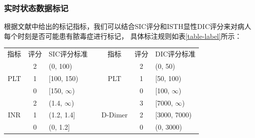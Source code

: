 \documentclass[12pt, a4paper, oneside]{ctexart}
\numberwithin{equation}{section}  %
\begin{document}
\subsubsection{实时状态数据标记}
根据文献\cite{bib-determine-dic}中给出的标记指标，我们可以结合SIC评分和ISTH显性DIC评分来对病人每个时刻是否可能患有脓毒症进行标记，
具体标注规则如表\ref{table-label}所示：
\renewcommand\arraystretch{1.2} %
\begin{table}[H] %
    \centering %
\begin{tabular}{ccllccl}
\cline{1-3} \cline{5-7}
\multicolumn{1}{|c|}{指标}                   & \multicolumn{1}{c|}{评分} & \multicolumn{1}{c|}{SIC评分标准}      & \multicolumn{1}{c|}{} & \multicolumn{1}{c|}{指标}                       & \multicolumn{1}{c|}{评分} & \multicolumn{1}{c|}{DIC评分标准}        \\ \cline{1-3} \cline{5-7} 
\multicolumn{1}{|c|}{\multirow{3}{*}{PLT}} & \multicolumn{1}{c|}{2}  & \multicolumn{1}{l|}{(0, 100)}     & \multicolumn{1}{l|}{} & \multicolumn{1}{c|}{\multirow{3}{*}{PLT}}     & \multicolumn{1}{c|}{2}  & \multicolumn{1}{l|}{(0, 50)}        \\ \cline{2-3} \cline{6-7} 
\multicolumn{1}{|c|}{}                     & \multicolumn{1}{c|}{1}  & \multicolumn{1}{l|}{{[}100, 150)} & \multicolumn{1}{l|}{} & \multicolumn{1}{c|}{}                         & \multicolumn{1}{c|}{1}  & \multicolumn{1}{l|}{{[}50, 100)}    \\ \cline{2-3} \cline{6-7} 
\multicolumn{1}{|c|}{}                     & \multicolumn{1}{c|}{0}  & \multicolumn{1}{l|}{{[}150, $\infty$)}   & \multicolumn{1}{l|}{} & \multicolumn{1}{c|}{}                         & \multicolumn{1}{c|}{0}  & \multicolumn{1}{l|}{{[}100, $\infty$)}     \\ \cline{1-3} \cline{5-7} 
\multicolumn{1}{|c|}{\multirow{3}{*}{INR}} & \multicolumn{1}{c|}{2}  & \multicolumn{1}{l|}{(1.4, $\infty$)}     & \multicolumn{1}{l|}{} & \multicolumn{1}{c|}{\multirow{3}{*}{D-Dimer}} & \multicolumn{1}{c|}{3}  & \multicolumn{1}{l|}{{[}7000, $\infty$)}    \\ \cline{2-3} \cline{6-7} 
\multicolumn{1}{|c|}{}                     & \multicolumn{1}{c|}{1}  & \multicolumn{1}{l|}{(1.2, 1.4{]}} & \multicolumn{1}{l|}{} & \multicolumn{1}{c|}{}                         & \multicolumn{1}{c|}{2}  & \multicolumn{1}{l|}{{[}3000, 7000)} \\ \cline{2-3} \cline{6-7} 
\multicolumn{1}{|c|}{}                     & \multicolumn{1}{c|}{0}  & \multicolumn{1}{l|}{(0, 1.2{]}}   & \multicolumn{1}{l|}{} & \multicolumn{1}{c|}{}                         & \multicolumn{1}{c|}{0}  & \multicolumn{1}{l|}{(0, 3000)}      \\ \cline{1-3} \cline{5-7} 

\end{tabular}
\end{table}
\end{document}
